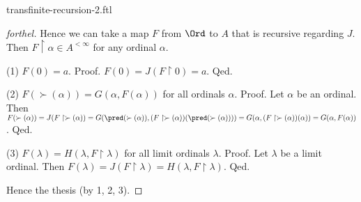 \documentclass{naproche-library}
\begin{document}
\begin{smodule}[title=Transfinite Recursion II]{transfinite-recursion-2.ftl}
\begin{proof}[forthel]
  Hence we can take a map $F$ from $\Ord$ to $A$ that is recursive regarding $J$.
  Then $F \restriction \alpha \in A^{< \infty}$ for any ordinal $\alpha$.

  (1) $F(0) = a$. \newline
  Proof.
    $F(0)
      = J(F \restriction 0)
      = a$.
  Qed.

  (2) $F(\succ(\alpha)) = G(\alpha, F(\alpha))$ for all ordinals $\alpha$. \newline
  Proof.
    Let $\alpha$ be an ordinal.
    Then $F(\succ(\alpha))
      = J(F \restriction \succ(\alpha))
      = G(\pred(\succ(\alpha)), (F \restriction \succ(\alpha))(\pred(\succ(\alpha))))
      = G(\alpha, (F \restriction \succ(\alpha))(\alpha))
      = G(\alpha, F(\alpha))$.
  Qed.

  (3) $F(\lambda) = H(\lambda, F \restriction \lambda)$ for all limit ordinals $\lambda$. \newline
  Proof.
    Let $\lambda$ be a limit ordinal.
    Then $F(\lambda)
      = J(F \restriction \lambda)
      = H(\lambda, F \restriction \lambda)$.
  Qed.

  Hence the thesis (by 1, 2, 3).
\end{proof}
\end{smodule}
\end{document}
